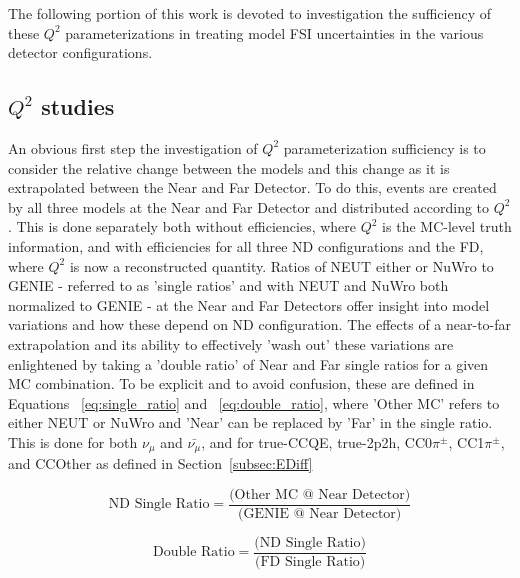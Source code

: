 \documentclass[12pt]{article}
\begin{document}
The following portion of this work is devoted to investigation the sufficiency of these $Q^2$ parameterizations in treating model FSI uncertainties in the various detector configurations.

\subsection{$Q^2$ studies}
An obvious first step the investigation of $Q^2$ parameterization sufficiency is to consider the relative change between the models and this change as it is extrapolated between the Near and Far Detector. To do this, events are created by all three models at the Near and Far Detector and distributed according to $Q^2$. This is done separately both without efficiencies, where $Q^2$ is the MC-level truth information, and with efficiencies for all three ND configurations and the FD, where $Q^2$ is now a reconstructed quantity. Ratios of NEUT either or NuWro to GENIE - referred to as 'single ratios' and with NEUT and NuWro both normalized to GENIE - at the Near and Far Detectors offer insight into model variations and how these depend on ND configuration. The effects of a near-to-far extrapolation and its ability to effectively 'wash out' these variations are enlightened by taking a 'double ratio' of Near and Far single ratios for a given MC combination. To be explicit and to avoid confusion, these are defined in Equations ~\ref{eq:single_ratio} and ~\ref{eq:double_ratio}, where 'Other MC' refers to either NEUT or NuWro and 'Near' can be replaced by 'Far' in the single ratio. This is done for both $\nu_{\mu}$ and $\bar{\nu_{\mu}}$, and for true-CCQE, true-2p2h, CC0$\pi^{\pm}$, CC1$\pi^{\pm}$, and CCOther as defined in Section~\ref{subsec:EDiff}

\begin{equation}
\label{eq:single_ratio}
\textrm{ND Single Ratio} = \frac{\textrm{(Other MC @ Near Detector)}}{\textrm{(GENIE @ Near Detector)}}
\end{equation}

\begin{equation}
\label{eq:double_ratio}
\textrm{Double Ratio} = \frac{\textrm{(ND Single Ratio)}}{\textrm{(FD Single Ratio)}}
\end{equation}
\end{document}
